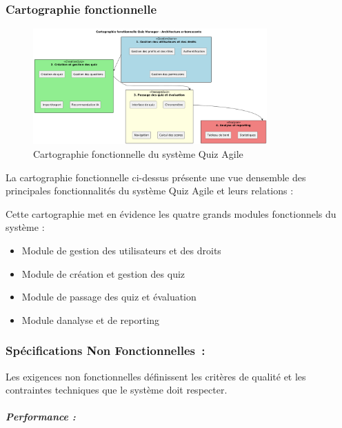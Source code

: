 \documentclass[12pt,a4paper,twoside,openright]{report}
\begin{document}
\hypertarget{cartographie-fonctionnelle}{%
\subsubsection{Cartographie
fonctionnelle}\label{cartographie-fonctionnelle}}

\begin{figure}[H]
\centering
\includegraphics[width=0.8\textwidth]{latex_media/media/image11.png}
\caption{Cartographie fonctionnelle du système Quiz Agile}
\label{fig:cartographie-fonctionnelle}
\end{figure}

La
cartographie fonctionnelle ci-dessus présente une vue
d\textquotesingle ensemble des principales fonctionnalités du système
Quiz Agile et leurs relations :

Cette cartographie met en évidence les quatre grands modules
fonctionnels du système :

\begin{itemize}
\item
  Module de gestion des utilisateurs et des droits
\item
  Module de création et gestion des quiz
\item
  Module de passage des quiz et évaluation
\item
  Module d\textquotesingle analyse et de reporting
\end{itemize}

\hypertarget{spuxe9cifications-non-fonctionnelles}{%
\subsubsection{Spécifications Non
Fonctionnelles~:}\label{spuxe9cifications-non-fonctionnelles}}

Les exigences non fonctionnelles définissent les critères de qualité et
les contraintes techniques que le système doit respecter.

\hypertarget{performance}{%
\subparagraph{Performance :}\label{performance}}
\end{document}
